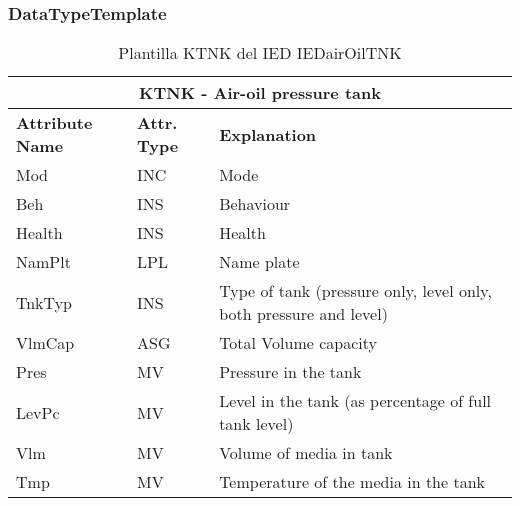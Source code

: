     \subsubsection{DataTypeTemplate}
    \begin{table}[H]
    \begin{center}
    \begin{tabular}{|l|l|p{8.5cm}|}
            \hline
            \multicolumn{3}{|c|}{\cellcolor[gray]{0.8} \textbf{ KTNK}  - Air-oil pressure tank} \\
            \hline
            \textbf{Attribute Name} & \textbf{Attr. Type} & \textbf{Explanation} \\
            \hline 
            Mod & INC & Mode \\
            \hline
            Beh & INS & Behaviour \\
            \hline
            Health & INS & Health \\
            \hline
            NamPlt & LPL & Name plate \\
            \hline
            TnkTyp & INS & Type of tank (pressure only, level only, both pressure and level) \\
            \hline
            VlmCap & ASG & Total Volume capacity \\
            \hline
            Pres & MV & Pressure in the tank \\
            \hline
            LevPc & MV & Level in the tank (as percentage of full  tank level) \\
            \hline
            Vlm & MV & Volume of media in tank \\
            \hline
            Tmp & MV & Temperature of the media in the tank \\
            \hline
    \end{tabular}
    \caption{Plantilla KTNK del IED IEDairOilTNK}
    \label{table:lnTypeKTNK_air_oil}
    \end{center}
    \end{table}
    
    
    